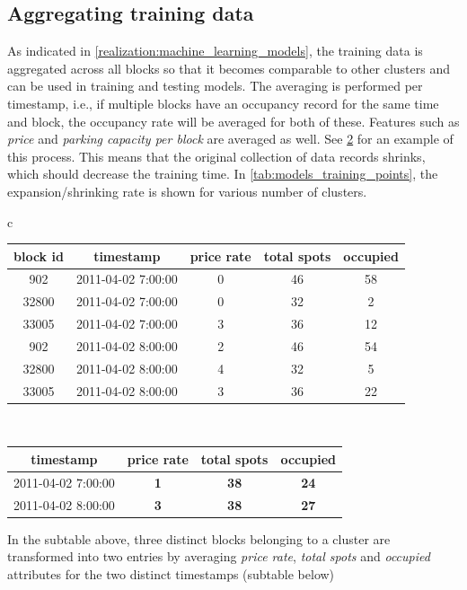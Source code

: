 \subsection{Aggregating training data}
\label{experimental_setup:aggregating_training_data}
As indicated in \cref{realization:machine_learning_models}, the training data is aggregated across all blocks so that it becomes comparable to other clusters and can be used in training and testing models. The averaging is performed per timestamp, i.e., if multiple blocks have an occupancy record for the same time and block, the occupancy rate will be averaged for both of these. Features such as \textit{price} and \textit{parking capacity per block} are averaged as well. See \cref{tab:aggregating_datapoints} for an example of this process. This means that the original collection of data records shrinks, which should decrease the training time. In \cref{tab:models_training_points}, the expansion/shrinking rate is shown for various number of clusters.

\begin{table}
	{\begin{tabular}{ c }
			\begin{tabular}{ | c | c | c | c | c |}
				\hline
				\textbf{block id} & \textbf{timestamp} & \textbf{price rate} & \textbf{total spots} & \textbf{occupied} \\ \hline
				902   & {2011-04-02 7:00:00} & 0 & 46 & 58 \\ \hline
				32800 & {2011-04-02 7:00:00} & 0 & 32 & 2 \\ \hline
				33005 & {2011-04-02 7:00:00} & 3 & 36 & 12 \\ \hline
				902   & {2011-04-02 8:00:00} & 2 & 46 & 54 \\ \hline
				32800 & {2011-04-02 8:00:00} & 4 & 32 & 5 \\ \hline
				33005 & {2011-04-02 8:00:00} & 3 & 36 & 22 \\ \hline
			\end{tabular} \\
			\colrule
			\begin{tabular}{ | c | c | c | c |}
				\hline
				\textbf{timestamp} & \textbf{price rate} & \textbf{total spots} & \textbf{occupied} \\ \hline
				{2011-04-02 7:00:00} & \textbf{1} & \textbf{38} & \textbf{24} \\ \hline
				{2011-04-02 8:00:00} & \textbf{3} & \textbf{38} & \textbf{27} \\ \hline
			\end{tabular}
	\end{tabular}}
	\begin{tabnote}
		In the subtable above, three distinct blocks belonging to a cluster are transformed into two entries by averaging \textit{price rate}, \textit{total spots} and \textit{occupied} attributes for the two distinct timestamps (subtable below)
	\end{tabnote}
	\label{tab:aggregating_datapoints}
\end{table}

